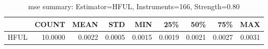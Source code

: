 \begin{table}[ht]
\centering
\caption{mse summary: Estimator=HFUL, Instruments=166, Strength=0.80}
\begin{tabular}{lrrrrrrrr}
\toprule
 & COUNT & MEAN & STD & MIN & 25\% & 50\% & 75\% & MAX \\
\midrule
HFUL & 10.0000 & 0.0022 & 0.0005 & 0.0015 & 0.0019 & 0.0021 & 0.0027 & 0.0031 \\
\bottomrule
\end{tabular}
\end{table}

